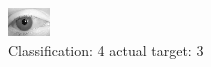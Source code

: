 \begin{figure}[h!]
\begin{center}
\includegraphics[width=0.60\columnwidth]{figures/ID2829_class_4_target_3.png}
\end{center}
\caption{ Classification: 4 actual target: 3}
\label{fig:ID2829_class_4_target_3}
\end{figure}
